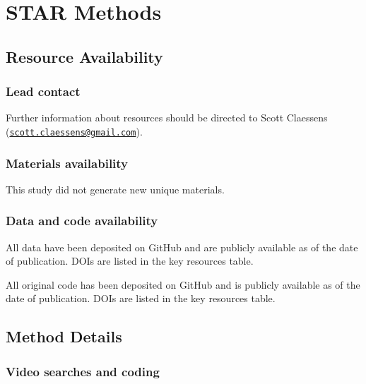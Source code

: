 \documentclass[
  man, donotrepeattitle,floatsintext]{apa6}
\begin{document}
\endgroup

\newpage
\linenumbers

\hypertarget{star-methods}{%
\section{STAR Methods}\label{star-methods}}

\hypertarget{resource-availability}{%
\subsection{Resource Availability}\label{resource-availability}}

\hypertarget{lead-contact}{%
\subsubsection{Lead contact}\label{lead-contact}}

Further information about resources should be directed to Scott Claessens
(\href{mailto:scott.claessens@gmail.com}{\nolinkurl{scott.claessens@gmail.com}}).

\hypertarget{materials-availability}{%
\subsubsection{Materials availability}\label{materials-availability}}

This study did not generate new unique materials.

\hypertarget{data-and-code-availability}{%
\subsubsection{Data and code availability}\label{data-and-code-availability}}

All data have been deposited on GitHub and are publicly available as of the date
of publication. DOIs are listed in the key resources table.

All original code has been deposited on GitHub and is publicly available as of
the date of publication. DOIs are listed in the key resources table.

\hypertarget{method-details}{%
\subsection{Method Details}\label{method-details}}

\hypertarget{video-searches-and-coding}{%
\subsubsection{Video searches and coding}\label{video-searches-and-coding}}
\end{document}
